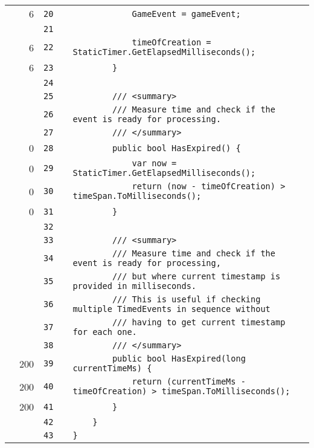 \documentclass[a4paper,landscape,10pt]{article}
\begin{document}
\begin{longtable}[l]{lrrll}
\cellcolor{green} & 6 & \verb~20~ & & \verb~            GameEvent = gameEvent;~\\
\cellcolor{gray} &  & \verb~21~ & & \verb~~\\
\cellcolor{green} & 6 & \verb~22~ & & \verb~            timeOfCreation = StaticTimer.GetElapsedMilliseconds();~\\
\cellcolor{green} & 6 & \verb~23~ & & \verb~        }~\\
\cellcolor{gray} &  & \verb~24~ & & \verb~~\\
\cellcolor{gray} &  & \verb~25~ & & \verb~        /// <summary>~\\
\cellcolor{gray} &  & \verb~26~ & & \verb~        /// Measure time and check if the event is ready for processing.~\\
\cellcolor{gray} &  & \verb~27~ & & \verb~        /// </summary>~\\
\cellcolor{red} & 0 & \verb~28~ & & \verb~        public bool HasExpired() {~\\
\cellcolor{red} & 0 & \verb~29~ & & \verb~            var now = StaticTimer.GetElapsedMilliseconds();~\\
\cellcolor{red} & 0 & \verb~30~ & & \verb~            return (now - timeOfCreation) > timeSpan.ToMilliseconds();~\\
\cellcolor{red} & 0 & \verb~31~ & & \verb~        }~\\
\cellcolor{gray} &  & \verb~32~ & & \verb~~\\
\cellcolor{gray} &  & \verb~33~ & & \verb~        /// <summary>~\\
\cellcolor{gray} &  & \verb~34~ & & \verb~        /// Measure time and check if the event is ready for processing,~\\
\cellcolor{gray} &  & \verb~35~ & & \verb~        /// but where current timestamp is provided in milliseconds.~\\
\cellcolor{gray} &  & \verb~36~ & & \verb~        /// This is useful if checking multiple TimedEvents in sequence without~\\
\cellcolor{gray} &  & \verb~37~ & & \verb~        /// having to get current timestamp for each one.~\\
\cellcolor{gray} &  & \verb~38~ & & \verb~        /// </summary>~\\
\cellcolor{green} & 200 & \verb~39~ & & \verb~        public bool HasExpired(long currentTimeMs) {~\\
\cellcolor{green} & 200 & \verb~40~ & & \verb~            return (currentTimeMs - timeOfCreation) > timeSpan.ToMilliseconds();~\\
\cellcolor{green} & 200 & \verb~41~ & & \verb~        }~\\
\cellcolor{gray} &  & \verb~42~ & & \verb~    }~\\
\cellcolor{gray} &  & \verb~43~ & & \verb~}~\\
\end{longtable}
\newpage
\end{document}
